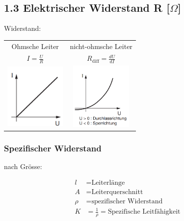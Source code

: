 \subsection*{1.3 Elektrischer Widerstand R [$\Omega$]}

Widerstand: 

\begin{tabular}{c c}
    Ohmsche Leiter & nicht-ohmsche Leiter \\
    $I = \frac{U}{R}$ & $R_{\text{diff}} = \frac{dU}{dI}$\\
    \includegraphics[width = 30mm]{src/images/plot_ohmscher_leiter.png} & \includegraphics[width = 30mm]{src/images/plot_nicht-ohmscher_leiter.png}
\end{tabular}

\subsubsection*{Spezifischer Widerstand}
nach Grösse:

\vspace{-1mm}
\begin{minipage}{0.49\linewidth}
    \begin{footnotesize}
        \begin{center}
        \end{center}
    \end{footnotesize}
\end{minipage}
\begin{minipage}{0.5\linewidth}
    \begin{scriptsize}
        \begin{center}
            \begin{align*}
                l &= \text{Leiterlänge}
                \\A &= \text{Leiterquerschnitt} 
                \\\rho &= \text{spezifischer Widerstand}
                \\  K &= \frac{1}{\rho} = \text{Spezifische Leitfähigkeit}
            \end{align*}
        \end{center}
    \end{scriptsize}
\end{minipage}
\vspace{1mm}

